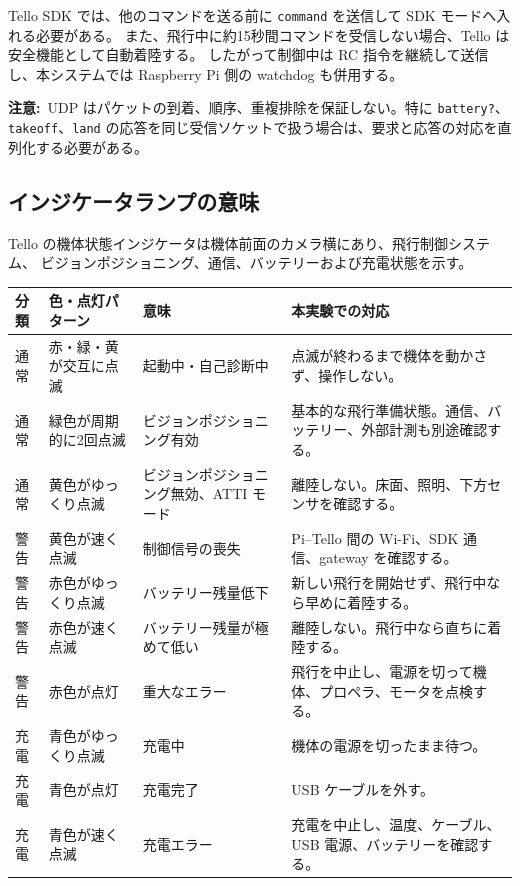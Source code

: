 \documentclass[11pt,a4paper]{ltjsarticle}
\newcommand{\code}[1]{\texttt{\small #1}}
\newcommand{\warning}[1]{\par\smallskip\noindent\textbf{注意:}~#1\par\smallskip}
\begin{document}
Tello SDK では、他のコマンドを送る前に \code{command} を送信して SDK モードへ入れる必要がある。
また、飛行中に約15秒間コマンドを受信しない場合、Tello は安全機能として自動着陸する。
したがって制御中は RC 指令を継続して送信し、本システムでは Raspberry Pi 側の watchdog も併用する。

\warning{UDP はパケットの到着、順序、重複排除を保証しない。特に \code{battery?}、\code{takeoff}、\code{land} の応答を同じ受信ソケットで扱う場合は、要求と応答の対応を直列化する必要がある。}

\subsection{インジケータランプの意味}

Tello の機体状態インジケータは機体前面のカメラ横にあり、飛行制御システム、
ビジョンポジショニング、通信、バッテリーおよび充電状態を示す。

\begin{longtable}{@{}p{2.2cm}p{4.0cm}p{4.7cm}p{4.0cm}@{}}
\toprule
\textbf{分類} & \textbf{色・点灯パターン} & \textbf{意味} & \textbf{本実験での対応} \\
\midrule
\endhead
通常 & 赤・緑・黄が交互に点滅 & 起動中・自己診断中 & 点滅が終わるまで機体を動かさず、操作しない。\\
通常 & 緑色が周期的に2回点滅 & ビジョンポジショニング有効 & 基本的な飛行準備状態。通信、バッテリー、外部計測も別途確認する。\\
通常 & 黄色がゆっくり点滅 & ビジョンポジショニング無効、ATTI モード & 離陸しない。床面、照明、下方センサを確認する。\\
警告 & 黄色が速く点滅 & 制御信号の喪失 & Pi--Tello 間の Wi-Fi、SDK 通信、gateway を確認する。\\
警告 & 赤色がゆっくり点滅 & バッテリー残量低下 & 新しい飛行を開始せず、飛行中なら早めに着陸する。\\
警告 & 赤色が速く点滅 & バッテリー残量が極めて低い & 離陸しない。飛行中なら直ちに着陸する。\\
警告 & 赤色が点灯 & 重大なエラー & 飛行を中止し、電源を切って機体、プロペラ、モータを点検する。\\
充電 & 青色がゆっくり点滅 & 充電中 & 機体の電源を切ったまま待つ。\\
充電 & 青色が点灯 & 充電完了 & USB ケーブルを外す。\\
充電 & 青色が速く点滅 & 充電エラー & 充電を中止し、温度、ケーブル、USB 電源、バッテリーを確認する。\\
\bottomrule
\end{longtable}
\end{document}
